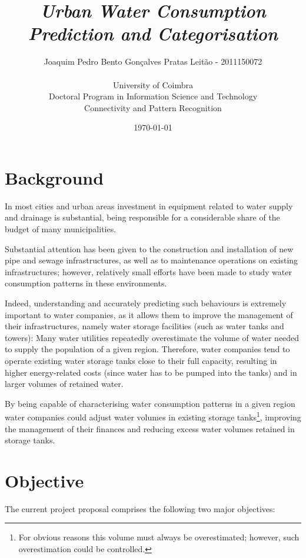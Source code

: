 \documentclass[11pt]{article}
\title{\textsl{Urban Water Consumption Prediction and Categorisation}\\ \vspace{0.5cm}}
\author{Joaquim Pedro Bento Gonçalves Pratas Leitão - 2011150072\\ \\University of Coimbra\\Doctoral Program in Information Science and Technology\\Connectivity and Pattern Recognition}
\date{\today}
\begin{document}
\maketitle

\section{Background}

In most cities and urban areas investment in equipment related to water supply and drainage is substantial, being responsible for a considerable share of the budget of many municipalities.

Substantial attention has been given to the construction and installation of new pipe and sewage infrastructures, as well as to maintenance operations on existing infrastructures; however, relatively small efforts have been made to study water consumption patterns in these environments.

Indeed, understanding and accurately predicting such behaviours is extremely important to water companies, as it allows them to improve the management of their infrastructures, namely water storage facilities (such as water tanks and towers): Many water utilities repeatedly overestimate the volume of water needed to supply the population of a given region. Therefore, water companies tend to operate existing water storage tanks close to their full capacity, resulting in higher energy-related costs (since water has to be pumped into the tanks) and in larger volumes of retained water. 

By being capable of characterising water consumption patterns in a given region water companies could adjust water volumes in existing storage tanks\footnote{For obvious reasons this volume must always be overestimated; however, such overestimation could be controlled.}, improving the management of their finances and reducing excess water volumes retained in storage tanks.

\section{Objective}

The current project proposal comprises the following two major objectives:
\end{document}
